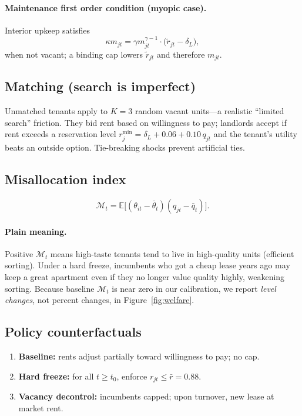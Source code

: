 \documentclass[11pt,a4paper]{article}
\begin{document}
\paragraph{Maintenance first order condition (myopic case).} Interior upkeep satisfies
\begin{equation}
    \kappa m_{jt}=\gamma m_{jt}^{\gamma-1}\cdot \bigl(\tilde r_{jt}-\delta_L\bigr),
    \label{eq:foc}
\end{equation}
when not vacant; a binding cap lowers $\tilde r_{jt}$ and therefore $m_{jt}$.

\subsection{Matching (search is imperfect)}

Unmatched tenants apply to $K=3$ random vacant units---a realistic ``limited search'' friction. They bid rent based on willingness to pay; landlords accept if rent exceeds a reservation level
$r_j^{\min}=\delta_L+0.06+0.10\,q_{jt}$ and the tenant's utility beats an outside option. Tie-breaking shocks prevent artificial ties.

\subsection{Misallocation index}

\begin{equation}
    \mathcal{M}_t=\mathbb{E}\bigl[(\theta_{it}-\bar\theta_t)(q_{jt}-\bar q_t)\bigr].
    \label{eq:misalloc}
\end{equation}

\paragraph{Plain meaning.} Positive $\mathcal{M}_t$ means high-taste tenants tend to live in high-quality units (efficient sorting). Under a hard freeze, incumbents who got a cheap lease years ago may keep a great apartment even if they no longer value quality highly, weakening sorting. Because baseline $\mathcal{M}_t$ is near zero in our calibration, we report \emph{level changes}, not percent changes, in Figure~\ref{fig:welfare}.

\subsection{Policy counterfactuals}

\begin{enumerate}
    \item \textbf{Baseline:} rents adjust partially toward willingness to pay; no cap.
    \item \textbf{Hard freeze:} for all $t\ge t_0$, enforce $r_{jt}\le\bar r=0.88$.
    \item \textbf{Vacancy decontrol:} incumbents capped; upon turnover, new lease at market rent.
\end{enumerate}
\end{document}
